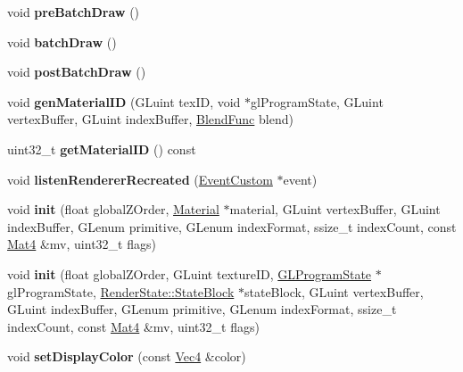 \begin{DoxyCompactItemize}
void {\bfseries pre\+Batch\+Draw} ()
\item 
\mbox{\label{classMeshCommand_ad597c5e7a60681a67b60921572e9b087}} 
void {\bfseries batch\+Draw} ()
\item 
\mbox{\label{classMeshCommand_a8fc2a01a7690084becbd553d17bd6011}} 
void {\bfseries post\+Batch\+Draw} ()
\item 
\mbox{\label{classMeshCommand_a5d25a18af7f89d6fc009d0c28873a8f6}} 
void {\bfseries gen\+Material\+ID} (G\+Luint tex\+ID, void $\ast$gl\+Program\+State, G\+Luint vertex\+Buffer, G\+Luint index\+Buffer, \hyperlink{structBlendFunc}{Blend\+Func} blend)
\item 
\mbox{\label{classMeshCommand_a9cf680774d0c105715d6d7a11e1d2e30}} 
uint32\+\_\+t {\bfseries get\+Material\+ID} () const
\item 
\mbox{\label{classMeshCommand_a6d638cebf2d5c9809a44d5f05ace2a5e}} 
void {\bfseries listen\+Renderer\+Recreated} (\hyperlink{classEventCustom}{Event\+Custom} $\ast$event)
\item 
\mbox{\label{classMeshCommand_a3a2f0f5afc750aa041f8834a936b271b}} 
void {\bfseries init} (float global\+Z\+Order, \hyperlink{classMaterial}{Material} $\ast$material, G\+Luint vertex\+Buffer, G\+Luint index\+Buffer, G\+Lenum primitive, G\+Lenum index\+Format, ssize\+\_\+t index\+Count, const \hyperlink{classMat4}{Mat4} \&mv, uint32\+\_\+t flags)
\item 
\mbox{\label{classMeshCommand_a96b4febd65cab75d3f8fd2f4060a7add}} 
void {\bfseries init} (float global\+Z\+Order, G\+Luint texture\+ID, \hyperlink{classGLProgramState}{G\+L\+Program\+State} $\ast$gl\+Program\+State, \hyperlink{classRenderState_1_1StateBlock}{Render\+State\+::\+State\+Block} $\ast$state\+Block, G\+Luint vertex\+Buffer, G\+Luint index\+Buffer, G\+Lenum primitive, G\+Lenum index\+Format, ssize\+\_\+t index\+Count, const \hyperlink{classMat4}{Mat4} \&mv, uint32\+\_\+t flags)
\item 
\mbox{\label{classMeshCommand_a39b7aab96030ae6bab92400de2ed8022}} 
void {\bfseries set\+Display\+Color} (const \hyperlink{classVec4}{Vec4} \&color)

\end{DoxyCompactItemize}
